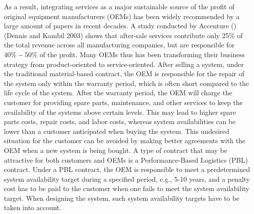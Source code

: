 \documentclass[preprint,12pt]{elsarticle}
\begin{document}
As a result, integrating services as a major sustainable source of the profit of original equipment manufacturers (OEMs) has been widely recommended by a large amount of papers in recent decades. A study conducted by Accenture (\citet{Dennis}) (Dennis and Kambil 2003) shows that after-sale services contribute only 25\% of the total revenue across all manufacturing companies, but are responsible for $40\%-50\%$ of the profit. Many OEMs thus has been transforming their business strategy from product-oriented to service-oriented. After selling a system, under the traditional material-based contract, the OEM is responsible for the repair of the system only within the warranty period, which is often short compared to the life cycle of the system. After the warranty period, the OEM will charge the customer for providing spare parts, maintenance, and other services to keep the availability of the systems above certain levels. This may lead to higher spare parts costs, repair costs, and labor costs, whereas system availabilities can be lower than a customer anticipated when buying the system. This undesired situation for the customer can be avoided by making better agreements with the OEM when a new system is being bought. A type of contract that may be attractive for both customers and OEMs is a Performance-Based Logistics (PBL) contract. Under a PBL contract, the OEM is responsible to meet a predetermined system availability target during a specified period, e.g., 5-10 years, and a penalty cost has to be paid to the customer when one fails to meet the system availability target. When designing the system, such system availability targets have to be taken into account.
\clearpage
\end{document}
